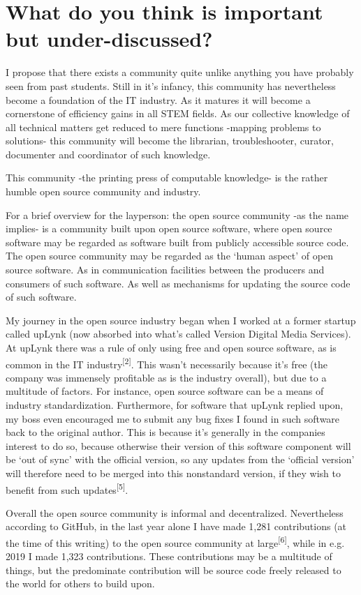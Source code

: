 \section{What do you think is important but under-discussed?}


I propose that there exists a community quite unlike anything you have probably seen from past students. Still in it’s infancy, this community has nevertheless become a foundation of the IT industry. As it matures it will become a cornerstone of efficiency gains in all STEM fields. As our collective knowledge of all technical matters get reduced to mere functions -mapping problems to solutions- this community will become the librarian, troubleshooter, curator, documenter and coordinator of such knowledge.

This community -the printing press of computable knowledge- is the rather humble open source community and industry.

For a brief overview for the layperson: the open source community -as the name implies- is a community built upon open source software, where open source software may be regarded as software built from publicly accessible source code. The open source community may be regarded as the ‘human aspect’ of open source software. As in communication facilities between the producers and consumers of such software. As well as mechanisms for updating the source code of such software.

My journey in the open source industry began when I worked at a former startup called upLynk (now absorbed into what's called Version Digital Media Services). At upLynk there was a rule of only using free and open source software, as is common in the IT industry\textsuperscript{[2]}. This wasn’t necessarily because it’s free (the company was immensely profitable as is the industry overall), but due to a multitude of factors. For instance, open source software can be a means of industry standardization. Furthermore, for software that upLynk replied upon, my boss even encouraged me to submit any bug fixes I found in such software back to the original author. This is because it’s generally in the companies interest to do so, because otherwise their version of this software component will be ‘out of sync’ with the official version, so any updates from the ‘official version’ will therefore need to be merged into this nonstandard version, if they wish to benefit from such updates\textsuperscript{[5]}.

Overall the open source community is informal and decentralized. Nevertheless according to GitHub, in the last year alone I have made 1,281 contributions (at the time of this writing) to the open source community at large\textsuperscript{[6]}, while in e.g. 2019 I made 1,323 contributions. These contributions may be a multitude of things, but the predominate contribution will be source code freely released to the world for others to build upon. 

